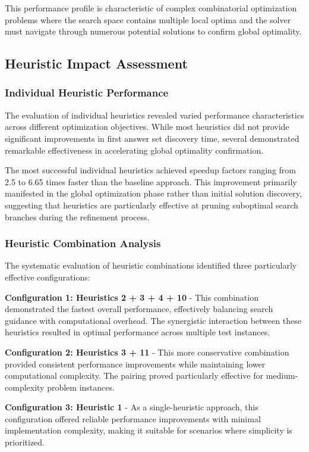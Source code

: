 \documentclass[11pt,a4paper]{article}
\begin{document}
This performance profile is characteristic of complex combinatorial optimization problems where the search space contains multiple local optima and the solver must navigate through numerous potential solutions to confirm global optimality.

\subsection{Heuristic Impact Assessment}

\subsubsection{Individual Heuristic Performance}

The evaluation of individual heuristics revealed varied performance characteristics across different optimization objectives. While most heuristics did not provide significant improvements in first answer set discovery time, several demonstrated remarkable effectiveness in accelerating global optimality confirmation.

The most successful individual heuristics achieved speedup factors ranging from 2.5 to 6.65 times faster than the baseline approach. This improvement primarily manifested in the global optimization phase rather than initial solution discovery, suggesting that heuristics are particularly effective at pruning suboptimal search branches during the refinement process.

\subsubsection{Heuristic Combination Analysis}

The systematic evaluation of heuristic combinations identified three particularly effective configurations:

\textbf{Configuration 1: Heuristics 2 + 3 + 4 + 10} - This combination demonstrated the fastest overall performance, effectively balancing search guidance with computational overhead. The synergistic interaction between these heuristics resulted in optimal performance across multiple test instances.

\textbf{Configuration 2: Heuristics 3 + 11} - This more conservative combination provided consistent performance improvements while maintaining lower computational complexity. The pairing proved particularly effective for medium-complexity problem instances.

\textbf{Configuration 3: Heuristic 1} - As a single-heuristic approach, this configuration offered reliable performance improvements with minimal implementation complexity, making it suitable for scenarios where simplicity is prioritized.
\end{document}
